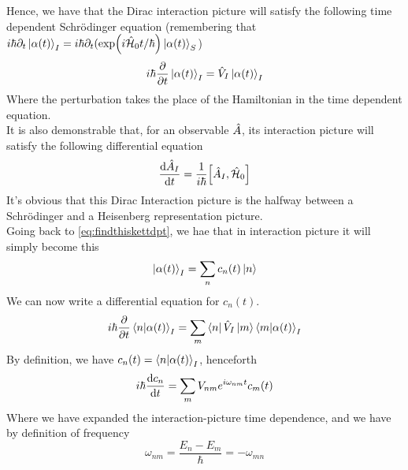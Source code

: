 \documentclass[../qm.tex]{subfiles}
\begin{document}
	Hence, we have that the Dirac interaction picture will satisfy the following time dependent Schrödinger equation (remembering that $i\hbar\partial_t\ket{\alpha(t)}_I=i\hbar\partial_t(\exp(i\hat{\mathcal{H}}_0t/\hbar)\ket{\alpha(t)}_S$)
	\begin{equation}
		i\hbar\pdv{t}\ket{\alpha(t)}_I=\hat{V}_I\ket{\alpha(t)}_I
		\label{eq:interactiontdschr}
	\end{equation}
	Where the perturbation takes the place of the Hamiltonian in the time dependent equation.\\
	It is also demonstrable that, for an observable $\hat{A}$, its interaction picture will satisfy the following differential equation
	\begin{equation}
		\derivative{\opr{A}_I}{t}=\frac{1}{i\hbar}\comm{\opr{A}_I}{\opr{\ham}_0}
		\label{eq:intpicobsder}
	\end{equation}
	It's obvious that this Dirac Interaction picture is the halfway between a Schrödinger and a Heisenberg representation picture.\\
	Going back to \eqref{eq:findthiskettdpt}, we hae that in interaction picture it will simply become this
	\begin{equation}
		\ket{\alpha(t)}_I=\sum_nc_n(t)\ket{n}
		\label{eq:intpicbasis}
	\end{equation}
	We can now write a differential equation for $c_n(t)$.
	\begin{equation}
		i\hbar\pdv{t}\bra{n}\ket{\alpha(t)}_I=\sum_m\bra{n}\hat{V}_I\ket{m}\bra{m}\ket{\alpha(t)}_I
		\label{eq:cteqdiff}
	\end{equation}
	By definition, we have $c_n(t)=\bra{n}\ket{\alpha(t)}_I$, henceforth
	\begin{equation}
		i\hbar\derivative{c_n}{t}=\sum_mV_{nm}e^{i\omega_{nm}t}c_m(t)
		\label{eq:ctrealeqdiff}
	\end{equation}
	Where we have expanded the interaction-picture time dependence, and we have by definition of frequency
	\begin{equation}
		\omega_{nm}=\frac{E_n-E_m}{\hbar}=-\omega_{mn}
		\label{eq:omeganmfreq}
	\end{equation}
\end{document}
